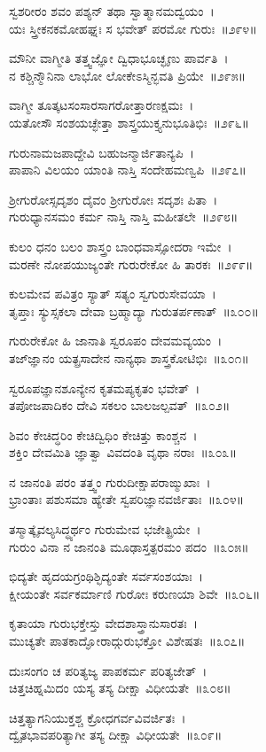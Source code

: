ಸ್ವಶರೀರಂ ಶವಂ ಪಶ್ಯನ್ ತಥಾ ಸ್ವಾತ್ಮಾನಮದ್ವಯಂ~।\\
ಯಃ ಸ್ತ್ರೀಕನಕಮೋಹಘ್ನಃ ಸ ಭವೇತ್ ಪರಮೋ ಗುರುಃ~॥೨೯೪॥

ಮೌನೀ ವಾಗ್ಮೀತಿ ತತ್ತ್ವಜ್ಞೋ ದ್ವಿಧಾಭೂಚ್ಛೃಣು ಪಾರ್ವತಿ~।\\
ನ ಕಶ್ಚಿನ್ಮೌನಿನಾ ಲಾಭೋ ಲೋಕೇಽಸ್ಮಿನ್ಭವತಿ ಪ್ರಿಯೇ~॥೨೯೫॥

ವಾಗ್ಮೀ ತೂತ್ಕಟಸಂಸಾರಸಾಗರೋತ್ತಾರಣಕ್ಷಮಃ~।\\
ಯತೋಸೌ ಸಂಶಯಚ್ಛೇತ್ತಾ ಶಾಸ್ತ್ರಯುಕ್ತ್ಯನುಭೂತಿಭಿಃ~॥೨೯೬॥

ಗುರುನಾಮಜಪಾದ್ದೇವಿ ಬಹುಜನ್ಮಾರ್ಜಿತಾನ್ಯಪಿ~।\\
ಪಾಪಾನಿ ವಿಲಯಂ ಯಾಂತಿ ನಾಸ್ತಿ ಸಂದೇಹಮಣ್ವಪಿ~॥೨೯೭॥

ಶ್ರೀಗುರೋಸ್ಸದೃಶಂ ದೈವಂ ಶ್ರೀಗುರೋಃ ಸದೃಶಃ ಪಿತಾ~।\\
ಗುರುಧ್ಯಾನಸಮಂ ಕರ್ಮ ನಾಸ್ತಿ ನಾಸ್ತಿ ಮಹೀತಲೇ~॥೨೯೮॥

ಕುಲಂ ಧನಂ ಬಲಂ ಶಾಸ್ತ್ರಂ ಬಾಂಧವಾಸ್ಸೋದರಾ ಇಮೇ~।\\
ಮರಣೇ ನೋಪಯುಜ್ಯಂತೇ ಗುರುರೇಕೋ ಹಿ ತಾರಕಃ~॥೨೯೯॥

ಕುಲಮೇವ ಪವಿತ್ರಂ ಸ್ಯಾತ್ ಸತ್ಯಂ ಸ್ವಗುರುಸೇವಯಾ~।\\
ತೃಪ್ತಾಃ ಸ್ಯುಸ್ಸಕಲಾ ದೇವಾ ಬ್ರಹ್ಮಾದ್ಯಾ ಗುರುತರ್ಪಣಾತ್~॥೩೦೦॥

ಗುರುರೇಕೋ ಹಿ ಜಾನಾತಿ ಸ್ವರೂಪಂ ದೇವಮವ್ಯಯಂ~।\\
ತಜ‌್‌ಜ್ಞಾನಂ ಯತ್ಪ್ರಸಾದೇನ ನಾನ್ಯಥಾ ಶಾಸ್ತ್ರಕೋಟಿಭಿಃ~॥೩೦೧॥

ಸ್ವರೂಪಜ್ಞಾನಶೂನ್ಯೇನ ಕೃತಮಪ್ಯಕೃತಂ ಭವೇತ್~।\\
ತಪೋಜಪಾದಿಕಂ ದೇವಿ ಸಕಲಂ ಬಾಲಜಲ್ಪವತ್~॥೩೦೨॥

ಶಿವಂ ಕೇಚಿದ್ಧರಿಂ ಕೇಚಿದ್ವಿಧಿಂ ಕೇಚಿತ್ತು ಕಾಂಶ್ಚನ~।\\
ಶಕ್ತಿಂ ದೇವಮಿತಿ ಜ್ಞಾತ್ವಾ ವಿವದಂತಿ ವೃಥಾ ನರಾಃ~॥೩೦೩॥

ನ ಜಾನಂತಿ ಪರಂ ತತ್ತ್ವಂ ಗುರುದೀಕ್ಷಾಪರಾಙ್ಮುಖಾಃ~।\\
ಭ್ರಾಂತಾಃ ಪಶುಸಮಾ ಹ್ಯೇತೇ ಸ್ವಪರಿಜ್ಞಾನವರ್ಜಿತಾಃ~॥೩೦೪॥

ತಸ್ಮಾತ್ಕೈವಲ್ಯಸಿದ್ಧ್ಯರ್ಥಂ ಗುರುಮೇವ ಭಜೇತ್ಪ್ರಿಯೇ~।\\
ಗುರುಂ ವಿನಾ ನ ಜಾನಂತಿ ಮೂಢಾಸ್ತತ್ಪರಮಂ ಪದಂ~॥೩೦೫॥

ಭಿದ್ಯತೇ ಹೃದಯಗ್ರಂಥಿಶ್ಛಿದ್ಯಂತೇ ಸರ್ವಸಂಶಯಾಃ~।\\
ಕ್ಷೀಯಂತೇ ಸರ್ವಕರ್ಮಾಣಿ ಗುರೋಃ ಕರುಣಯಾ ಶಿವೇ~॥೩೦೬॥

ಕೃತಾಯಾ ಗುರುಭಕ್ತೇಸ್ತು ವೇದಶಾಸ್ತ್ರಾನುಸಾರತಃ~।\\
ಮುಚ್ಯತೇ ಪಾತಕಾದ್ಘೋರಾದ್ಗುರುಭಕ್ತೋ ವಿಶೇಷತಃ~॥೩೦೭॥

ದುಃಸಂಗಂ ಚ ಪರಿತ್ಯಜ್ಯ ಪಾಪಕರ್ಮ ಪರಿತ್ಯಜೇತ್~।\\
ಚಿತ್ತಚಿಹ್ನಮಿದಂ ಯಸ್ಯ ತಸ್ಯ ದೀಕ್ಷಾ ವಿಧೀಯತೇ~॥೩೦೮॥

ಚಿತ್ತತ್ಯಾಗನಿಯುಕ್ತಶ್ಚ ಕ್ರೋಧಗರ್ವವಿವರ್ಜಿತಃ~।\\
ದ್ವೈತಭಾವಪರಿತ್ಯಾಗೀ ತಸ್ಯ ದೀಕ್ಷಾ ವಿಧೀಯತೇ~॥೩೦೯॥

